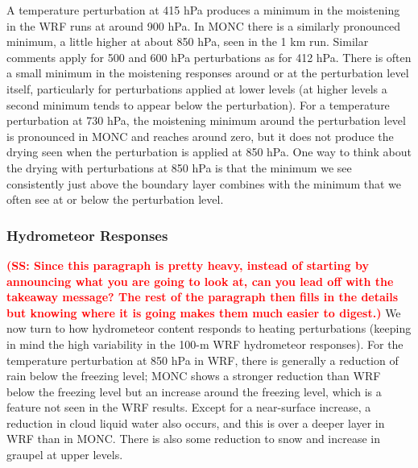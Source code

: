 \documentclass[draft]{agujournal2019}
\newcommand{\todo}[1]{\textcolor{red}{\textbf{(#1)}}}
\begin{document}
A temperature perturbation
at 415 hPa produces a minimum in the moistening in the WRF runs at around 900
hPa. In MONC there is a similarly pronounced minimum, a little higher at about
850 hPa, seen in the 1 km run. Similar comments apply for 500 and 600 hPa 
perturbations as for 412 hPa. There is often a small minimum in the moistening 
responses around or at
the perturbation level itself, particularly for perturbations applied at lower
levels (at higher levels a second minimum tends to appear below the
perturbation). For a temperature perturbation at 730 hPa, the moistening minimum
around the perturbation level is pronounced in MONC and reaches around zero, but
it does not produce the drying seen when the perturbation is applied at 850 hPa.
One way to think about the drying with perturbations at 850 hPa is that the
minimum we see consistently just above the boundary layer combines with the
minimum that we often see at or below the perturbation level.

\subsubsection{Hydrometeor Responses}

\todo{SS: Since this paragraph is pretty heavy, instead of starting by
announcing what you are going to look at, can you lead off with the takeaway
message?  The rest of the paragraph then fills in the details but knowing where
it is going makes them much easier to digest.} We now turn to how hydrometeor
content responds to heating perturbations (keeping in mind the high variability
in the 100-m WRF hydrometeor responses). For the temperature perturbation at 850
hPa in WRF, there is generally a reduction of rain below the freezing level;
MONC shows a stronger reduction than WRF below the freezing level but an
increase around the freezing level, which is a feature not seen in the WRF
results. Except for a near-surface increase, a reduction in cloud liquid water
also occurs, and this is over a deeper layer in WRF than in MONC. There is also
some reduction to snow and increase in graupel at upper levels. 
\end{document}
